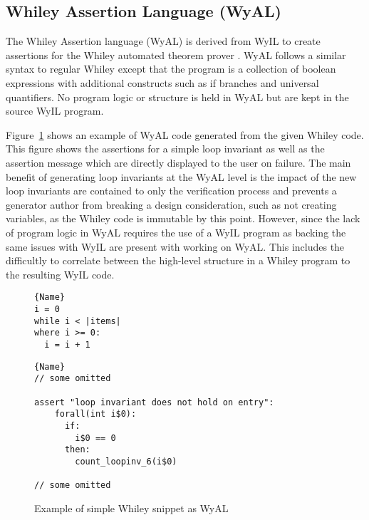 \subsection{Whiley Assertion Language (WyAL)}

The Whiley Assertion language (WyAL) is derived from WyIL to create
assertions for the Whiley automated theorem prover \cite{wyal}.
WyAL follows a similar syntax to regular Whiley except that the program
is a collection of boolean expressions with additional constructs such as
if branches and universal quantifiers.
No program logic or structure is held in WyAL but are kept in the source
WyIL program.

Figure~\ref{lst:design-wyal} shows an example of WyAL code generated from
the given Whiley code.
This figure shows the assertions for a simple loop invariant as well as the
assertion message which are directly displayed to the user on failure.
The main benefit of generating loop invariants at the WyAL level is the
impact of the new loop invariants are contained to only the verification
process and prevents a generator author from breaking a design consideration,
such as not creating variables, as the Whiley code is immutable by this point.
However, since the lack of program logic in WyAL requires the use of a WyIL program
as backing the same issues with WyIL are present with working on WyAL.
This includes the difficultly to correlate between the high-level structure
in a Whiley program to the resulting WyIL code.

\begin{figure}
\noindent\begin{minipage}{.45\textwidth}
\begin{lstlisting}[caption={Whiley Code},frame=tlrb,numbers=none]{Name}
i = 0
while i < |items|
where i >= 0:
  i = i + 1
\end{lstlisting}
\end{minipage}\hfill
\begin{minipage}{.45\textwidth}
\begin{lstlisting}[caption={WyAL Code},frame=tlrb,numbers=none,breaklines=true]{Name}
// some omitted
      
assert "loop invariant does not hold on entry":
    forall(int i$0):
      if:
        i$0 == 0
      then:
        count_loopinv_6(i$0)

// some omitted
\end{lstlisting}
\end{minipage}
\caption{Example of simple Whiley snippet as WyAL}
\label{lst:design-wyal}
\end{figure}

